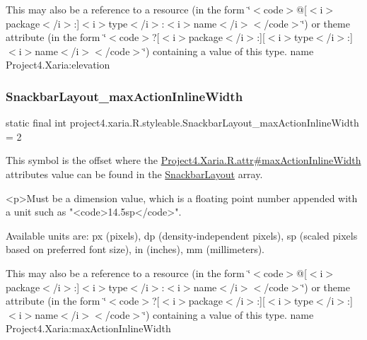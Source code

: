 This may also be a reference to a resource (in the form \char`\"{}$<$code$>$@\mbox{[}$<$i$>$package$<$/i$>$\+:\mbox{]}$<$i$>$type$<$/i$>$\+:$<$i$>$name$<$/i$>$$<$/code$>$\char`\"{}) or theme attribute (in the form \char`\"{}$<$code$>$?\mbox{[}$<$i$>$package$<$/i$>$\+:\mbox{]}\mbox{[}$<$i$>$type$<$/i$>$\+:\mbox{]}$<$i$>$name$<$/i$>$$<$/code$>$\char`\"{}) containing a value of this type.  name Project4.\+Xaria\+:elevation \mbox{\label{classproject4_1_1xaria_1_1R_1_1styleable_a48e0fac8abd650e6887e336aa35757a8}} 
\subsubsection{\texorpdfstring{Snackbar\+Layout\+\_\+max\+Action\+Inline\+Width}{SnackbarLayout\_maxActionInlineWidth}}
{\footnotesize\ttfamily static final int project4.\+xaria.\+R.\+styleable.\+Snackbar\+Layout\+\_\+max\+Action\+Inline\+Width = 2\hspace{0.3cm}{\ttfamily [static]}}

This symbol is the offset where the \hyperlink{}{Project4.\+Xaria.\+R.\+attr\#max\+Action\+Inline\+Width} attribute\textquotesingle{}s value can be found in the \hyperlink{classproject4_1_1xaria_1_1R_1_1styleable_ab79dc56e0952cebd4f7831958f917b48}{Snackbar\+Layout} array.

\begin{DoxyVerb}      <p>Must be a dimension value, which is a floating point number appended with a unit such as "<code>14.5sp</code>".
\end{DoxyVerb}
 Available units are\+: px (pixels), dp (density-\/independent pixels), sp (scaled pixels based on preferred font size), in (inches), mm (millimeters). 

This may also be a reference to a resource (in the form \char`\"{}$<$code$>$@\mbox{[}$<$i$>$package$<$/i$>$\+:\mbox{]}$<$i$>$type$<$/i$>$\+:$<$i$>$name$<$/i$>$$<$/code$>$\char`\"{}) or theme attribute (in the form \char`\"{}$<$code$>$?\mbox{[}$<$i$>$package$<$/i$>$\+:\mbox{]}\mbox{[}$<$i$>$type$<$/i$>$\+:\mbox{]}$<$i$>$name$<$/i$>$$<$/code$>$\char`\"{}) containing a value of this type.  name Project4.\+Xaria\+:max\+Action\+Inline\+Width \mbox{\label{classproject4_1_1xaria_1_1R_1_1styleable_ad3bf2b8838fd43ac4b50c5c40afa1039}} 

